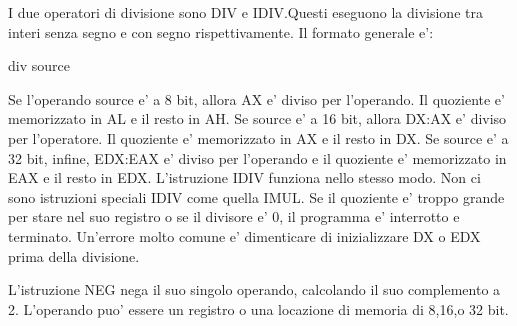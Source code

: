I due operatori di divisione sono {\code DIV} e {\code IDIV}.Questi 
eseguono la divisione tra interi senza segno e con segno rispettivamente.
Il formato generale e': 
\begin{AsmCodeListing}[numbers=none,frame=none]
      div   source
\end{AsmCodeListing}
Se l'operando source e' a 8 bit, allora AX e' diviso per l'operando. Il
quoziente e' memorizzato in AL e il resto in AH. Se source e' a 16 bit,
allora DX:AX e' diviso per l'operatore. Il quoziente e' memorizzato
in AX e il resto in DX. Se source e' a 32 bit, infine, EDX:EAX 
e' diviso per l'operando e il quoziente e' memorizzato in EAX e il
resto in EDX. L'istruzione {\code IDIV} funziona nello
stesso modo. Non ci sono istruzioni speciali {\code IDIV} come
quella {\code IMUL}. Se il quoziente e' troppo grande per stare
nel suo registro o se il divisore e' 0, il programma e' interrotto
e terminato. Un'errore molto comune e' dimenticare di inizializzare
DX o EDX prima della divisione.  

L'istruzione {\code NEG}  nega il suo singolo operando,
calcolando il suo complemento a 2. L'operando puo' essere un registro
o una locazione di memoria di 8,16,o 32 bit.

